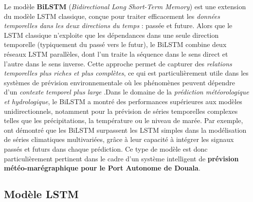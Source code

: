 \documentclass[a4paper,12pt,openany]{report}
\begin{document}
		Le modèle \textbf{BiLSTM} (\textit{Bidirectional Long Short-Term Memory}) est une extension du modèle LSTM classique, conçue pour traiter efficacement les \textit{données temporelles dans les deux directions du temps} : passée et future. Alors que le LSTM classique n’exploite que les dépendances dans une seule direction temporelle (typiquement du passé vers le futur), le BiLSTM combine deux réseaux LSTM parallèles, dont l’un traite la séquence dans le sens direct et l’autre dans le sens inverse. Cette approche permet de capturer des \textit{relations temporelles plus riches et plus complètes}, ce qui est particulièrement utile dans les systèmes de prévision environnementale où les phénomènes peuvent dépendre d’un \textit{contexte temporel plus large} \cite{Graves2005}.Dans le domaine de la \textit{prédiction météorologique et hydrologique}, le BiLSTM a montré des performances supérieures aux modèles unidirectionnels, notamment pour la prévision de séries temporelles complexes telles que les précipitations, la température ou le niveau de marée. Par exemple, \cite{Zhang2021} ont démontré que les BiLSTM surpassent les LSTM simples dans la modélisation de séries climatiques multivariées, grâce à leur capacité à intégrer les signaux passés et futurs dans chaque prédiction. Ce type de modèle est donc particulièrement pertinent dans le cadre d’un système intelligent de \textbf{prévision météo-marégraphique pour le Port Autonome de Douala}.
		
		
	
		\subsection{ Modèle LSTM}
                         
\end{document}
